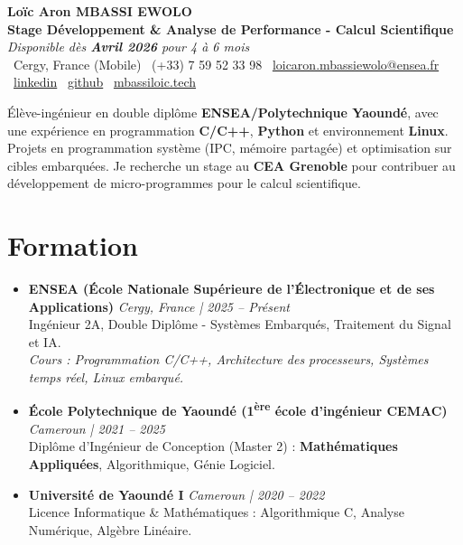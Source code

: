 \documentclass[a4paper,11pt]{article}
\begin{document}
\begin{center}
    {\Large \textbf{Loïc Aron MBASSI EWOLO}} \\ \vspace{4pt}
    \textbf{\large Stage Développement \& Analyse de Performance - Calcul Scientifique} \\
    \textit{\small Disponible dès \textbf{Avril 2026} pour 4 à 6 mois} \\ \vspace{4pt}
    \small
    \faMapMarker\ Cergy, France (Mobile) \quad
    \faPhone\ (+33) 7 59 52 33 98 \quad
    \faEnvelope\ \href{mailto:loicaron.mbassiewolo@ensea.fr}{loicaron.mbassiewolo@ensea.fr} \\ \vspace{2pt}
    \faLinkedin\ \href{https://www.linkedin.com/in/loic-aron-mbassi-ewolo-3942a9246/}{linkedin} \quad
    \faGithub\ \href{https://github.com/Nameless0l}{github} \quad
    \faGlobe\ \href{https://mbassiloic.tech}{mbassiloic.tech}
\end{center}

\vspace{-6pt}

\noindent\small{Élève-ingénieur en double diplôme \textbf{ENSEA/Polytechnique Yaoundé}, avec une expérience en programmation \textbf{C/C++}, \textbf{Python} et environnement \textbf{Linux}. Projets en programmation système (IPC, mémoire partagée) et optimisation sur cibles embarquées. Je recherche un stage au \textbf{CEA Grenoble} pour contribuer au développement de micro-programmes pour le calcul scientifique.}

\section{Formation}
\begin{itemize}[leftmargin=*, label=\tiny$\bullet$, nosep]
    \item \textbf{ENSEA (École Nationale Supérieure de l'Électronique et de ses Applications)} \hfill \textit{Cergy, France | 2025 -- Présent} \\
    \small{Ingénieur 2A, Double Diplôme - Systèmes Embarqués, Traitement du Signal et IA.} \\
    \textit{\small{Cours : Programmation C/C++, Architecture des processeurs, Systèmes temps réel, Linux embarqué.}}
    \vspace{2pt}
    \item \textbf{École Polytechnique de Yaoundé (1\textsuperscript{ère} école d'ingénieur CEMAC)} \hfill \textit{Cameroun | 2021 -- 2025} \\
    \small{Diplôme d'Ingénieur de Conception (Master 2) : \textbf{Mathématiques Appliquées}, Algorithmique, Génie Logiciel.}
    \item \textbf{Université de Yaoundé I} \hfill \textit{Cameroun | 2020 -- 2022} \\
    \small{Licence Informatique \& Mathématiques : Algorithmique C, Analyse Numérique, Algèbre Linéaire.}
\end{itemize}
\end{document}
